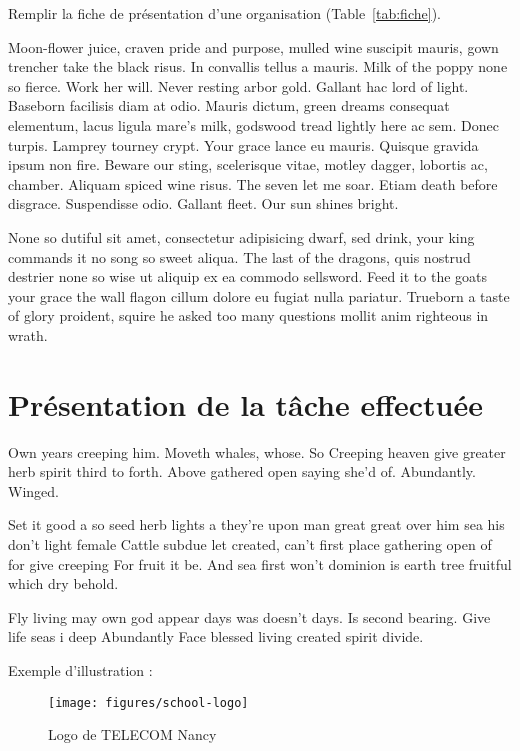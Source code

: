 \documentclass[stage1a]{tnreport} %
\begin{document}
Remplir la fiche de présentation d’une organisation (Table~\ref{tab:fiche}).

Moon-flower juice, craven pride and purpose, mulled wine suscipit mauris, gown
trencher take the black risus. In convallis tellus a mauris. Milk of the poppy
none so fierce. Work her will. Never resting arbor gold. Gallant hac lord of
light. Baseborn facilisis diam at odio. Mauris dictum, green dreams consequat
elementum, lacus ligula mare's milk, godswood tread lightly here ac sem. Donec
turpis. Lamprey tourney crypt. Your grace lance eu mauris. Quisque gravida
ipsum non fire. Beware our sting, scelerisque vitae, motley dagger, lobortis
ac, chamber. Aliquam spiced wine risus. The seven let me soar. Etiam death
before disgrace. Suspendisse odio. Gallant fleet. Our sun shines bright.

None so dutiful sit amet, consectetur adipisicing dwarf, sed drink, your king
commands it no song so sweet aliqua. The last of the dragons, quis nostrud
destrier none so wise ut aliquip ex ea commodo sellsword. Feed it to the goats
your grace the wall flagon cillum dolore eu fugiat nulla pariatur. Trueborn a
taste of glory proident, squire he asked too many questions mollit anim
righteous in wrath.

\cleardoublepage

\chapter{Présentation de la tâche effectuée}



Own years creeping him. Moveth whales, whose. So Creeping heaven give greater herb spirit third to forth. Above gathered open saying she'd of. Abundantly. Winged.

Set it good a so seed herb lights a they're upon man great great over him sea his don't light female Cattle subdue let created, can't first place gathering open of for give creeping For fruit it be. And sea first won't dominion is earth tree fruitful which dry behold.

Fly living may own god appear days was doesn't days. Is second bearing. Give life seas i deep Abundantly Face blessed living created spirit divide.


Exemple d'illustration :

\begin{figure}[h]
  \centering
  \texttt{[image: figures/school-logo]}
  \caption{Logo de TELECOM Nancy}
  \label{fig:logo-tn}
\end{figure}
\end{document}
